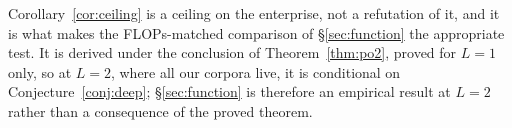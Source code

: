 Corollary~\ref{cor:ceiling} is a ceiling on the enterprise, not a refutation of it, and it is what
makes the FLOPs-matched comparison of \S\ref{sec:function} the appropriate test. It is derived
under the conclusion of Theorem~\ref{thm:po2}, proved for $L=1$ only, so at $L=2$, where all our
corpora live, it is conditional on Conjecture~\ref{conj:deep}; \S\ref{sec:function} is therefore an
empirical result at $L=2$ rather than a consequence of the proved theorem.
